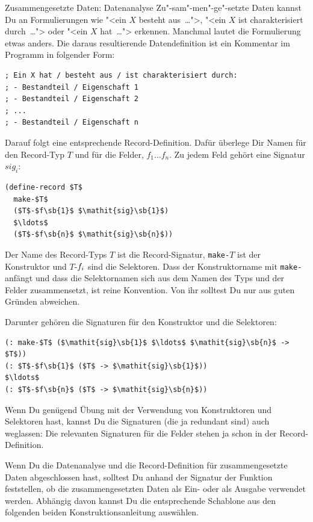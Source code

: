 \begin{konstruktionsanleitung}{Zusammengesetzte Daten: Datenanalyse}
  \label{ka:zusammengesetzt-datenanalyse}
Zu"-sam"-men"-ge"-setzte Daten kannst Du an Formulierungen wie "<ein $X$
besteht aus~\ldots">, "<ein $X$ ist charakterisiert durch~\ldots">
oder "<ein $X$ hat~\ldots"> erkennen.  Manchmal lautet die
Formulierung etwas anders.  Die daraus resultierende Datendefinition
ist ein Kommentar im Programm in folgender Form:
%
\begin{lstlisting}
; Ein X hat / besteht aus / ist charakterisiert durch:
; - Bestandteil / Eigenschaft 1
; - Bestandteil / Eigenschaft 2
; ...
; - Bestandteil / Eigenschaft n
\end{lstlisting}
%
Darauf folgt eine entsprechende Record-Definition.
Dafür überlege Dir Namen für den Record-Typ $T$ und für die
Felder, $f_1 \ldots f_n$.  Zu jedem Feld gehört
eine Signatur $\mathit{sig}_{i}$:
%
\begin{lstlisting}
(define-record $T$
  make-$T$
  ($T$-$f\sb{1}$ $\mathit{sig}\sb{1}$)
  $\ldots$
  ($T$-$f\sb{n}$ $\mathit{sig}\sb{n}$))
\end{lstlisting}
%
Der Name des Record-Typs \(T\) ist die Record-Signatur,
\lstinline{make-}\(T\) ist der Konstruktor und \(T\)-\(f\sb{i}\)
sind die Selektoren.
Dass der Konstruktorname mit \lstinline{make-} anfängt und dass die
Selektornamen sich aus dem Namen des Typs und der Felder
zusammensetzt, ist reine Konvention.  Von ihr solltest Du nur aus
guten Gründen abweichen.

Darunter gehören die Signaturen für den Konstruktor
und die Selektoren:
%
\begin{lstlisting}
(: make-$T$ ($\mathit{sig}\sb{1}$ $\ldots$ $\mathit{sig}\sb{n}$ -> $T$))
(: $T$-$f\sb{1}$ ($T$ -> $\mathit{sig}\sb{1}$))
$\ldots$
(: $T$-$f\sb{n}$ ($T$ -> $\mathit{sig}\sb{n}$))
\end{lstlisting}
%
\end{konstruktionsanleitung}

\pagebreak[1]

Wenn Du genügend Übung mit der Verwendung von Konstruktoren und
Selektoren hast, kannst Du die Signaturen (die ja redundant sind)
auch weglassen: Die relevanten Signaturen für die Felder stehen ja
schon in der Record-Definition.

Wenn Du die Datenanalyse und die Record-Definition für
zusammengesetzte Daten abgeschlossen hast, solltest Du anhand der
Signatur der Funktion feststellen, ob die zusammengesetzten Daten als
Ein- oder als Ausgabe verwendet werden.  Abhängig davon kannst Du die
entsprechende Schablone aus den folgenden beiden
Konstruktionsanleitung auswählen.


